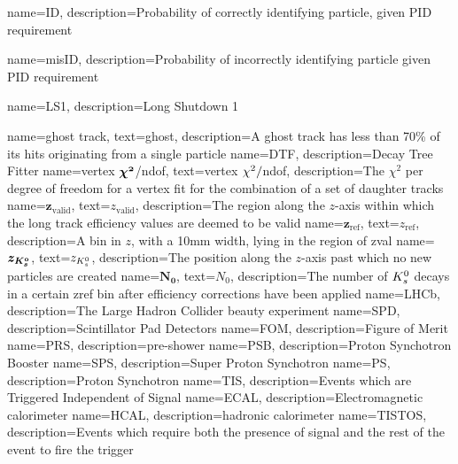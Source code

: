 
{
	name=ID,
		description={Probability of correctly identifying particle, given PID requirement}
}

{
	name=misID,
		description={Probability of incorrectly identifying particle given PID requirement}
}

{
	name=LS1,
		description={Long Shutdown 1}
}


{
	name=ghost track,
		text=ghost,
		description={A ghost track has less than 70\% of its hits originating from a single particle} 
}
{
	name=DTF,
		description={Decay Tree Fitter} 
}
{
	name=vertex $\mathbold{\chisq}$/ndof,
		text=vertex $\chi^2/$ndof,
		description={The $\chi^{2}$ per degree of freedom for a vertex fit for the combination of a set of daughter tracks} 
}
{
	name=$\mathbold{z_{\mathrm{valid}}}$,
		text=$z_{\mathrm{valid}}$,
		description={The region along the $z$-axis within which the long track efficiency values are deemed to be valid} 
}
{
	name=$\mathbold{z_{\mathrm{ref}}}$,
		text=$z_{\mathrm{ref}}$,
		description={A bin in $z$, with a 10mm width, lying in the region of \gls{zval}} 
}
{
	name=$\mathbold{z_{\KS}}$,
		text=$z_{{{K}^0_{s}}}$,
		description={The position along the $z$-axis past which no new \KS particles are created} 
}
{
	name=$\mathbold{N_{0}}$,
		text=$N_{0}$,
		description={The number of ${{K}^0_{s}}$ decays in a certain \gls{zref} bin after efficiency corrections have been applied}}
{
	name=LHCb,
		description={The Large Hadron Collider beauty experiment}
}
{
	name=SPD,
		description={Scintillator Pad Detectors}
}
{
	name=FOM,
		description={Figure of Merit}
}                                    
{
	name=PRS,
		description={pre-shower}
}                                    
{
	name=PSB,
		description={Proton Synchotron Booster}
}
{
	name=SPS,
		description={Super Proton Synchotron}
}
{
	name=PS,
		description={Proton Synchotron}
}
{
	name=TIS,
		description={Events which are Triggered Independent of Signal}
}
{
	name=ECAL,
		description={Electromagnetic calorimeter}
}
{
	name=HCAL,
		description={hadronic calorimeter}
}                                    
{
	name=TISTOS,
		description={Events which require both the presence of signal and the rest of the event to fire the trigger}
}                                    
